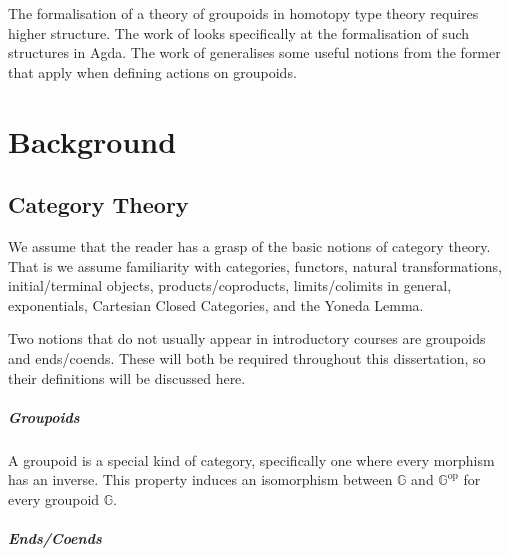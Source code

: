 \documentclass[12pt, parskip, DIV=14]{scrbook}
\begin{document}
The formalisation of a theory of groupoids in homotopy type theory requires higher structure. The work of \citet{hou2017higher} looks specifically at the formalisation of such structures in Agda. The work of \citet{kraus2014general} generalises some useful notions from the former that apply when defining actions on groupoids.

\chapter{Background}

\section{Category Theory}
\label{sec:cattheory}

We assume that the reader has a grasp of the basic notions of category theory. That is we assume familiarity with categories, functors, natural transformations, initial/terminal objects, products/coproducts, limits/colimits in general, exponentials, Cartesian Closed Categories, and the Yoneda Lemma.

Two notions that do not usually appear in introductory courses are groupoids and ends/coends. These will both be required throughout this dissertation, so their definitions will be discussed here.

\paragraph{Groupoids}

A groupoid is a special kind of category, specifically one where every morphism has an inverse. This property induces an isomorphism between $\mathbb{G}$ and $\mathbb{G}^\mathrm{op}$ for every groupoid $\mathbb{G}$.

\paragraph{Ends/Coends}
\end{document}
